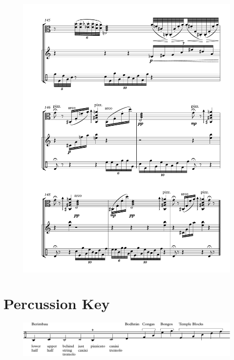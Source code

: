 \begin{figure}[htbp]
    \centering
	\includegraphics[width=6.5in]{figures/Viola_Percussion_22.pdf}
\end{figure}

\section*{Percussion Key}

\begin{figure}[H]
    \centering
    \includegraphics[width=6.5in]{figures/Percussion_Key.pdf}
\end{figure}

